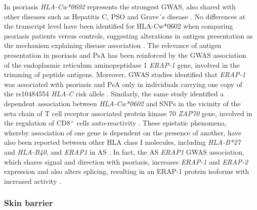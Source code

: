 In psoriasis \textit{HLA-Cw*0602} represents the strongest GWAS, also shared with other diseases such as Hepatitis C, PSO and Grave´s disease \parencite{Blais2011}. No differences at the transcript level have been identified for HLA-Cw*0602 when comparing psoriasis patients versus controls, suggesting alterations in antigen presentation as the mechanism explaining disease association \parencite{Hundhausen2012}. The relevance of antigen presentation in psoriasis and PsA has been reinforced by the GWAS association of the endoplasmic reticulum aminopeptidase 1 \textit{ERAP-1} gene, involved in the trimming of peptide antigens. Moreover, GWAS studies identified that \textit{ERAP-1} was associated with psoriasis and PsA only in individuals carrying one copy of the rs10484554 \textit{HLA-C} risk allele \parencite{Strange2010}. Similarly, the same study identified a dependent association between \textit{HLA-Cw*0602} and SNPs in the vicinity of the zeta chain of T cell receptor associated protein kinase 70 \textit{ZAP70} gene, involved in the regulation of CD8$^+$ cells auto-reactivity \parencite{Picard2009}. These epistatic phenomena, whereby association of one gene is dependent on the presence of another, have also been reported between other HLA class I molecules, including \textit{HLA-B*27} and \textit{HLA-B40}, and \textit{ERAP1} in AS \parencite{Evans2011, Cortes2015b}. In fact, the AS \textit{ERAP1} GWAS association, which shares signal and direction with psoriasis, increases \textit{ERAP-1} and \textit{ERAP-2} expression and also alters splicing, resulting in an ERAP-1 protein isoforms with increased activity \parencite{Constatino2015, Hanson2018}.

\subsubsection*{Skin barrier}

